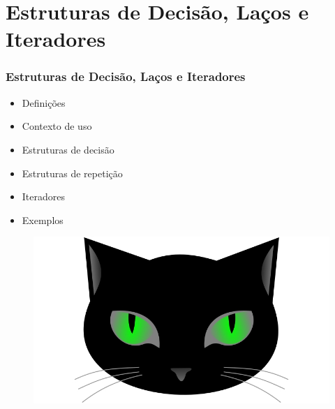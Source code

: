 \section{Estruturas de Decisão, Laços e Iteradores}

\begin{frame}
\frametitle{Estruturas de Decisão, Laços e Iteradores}
\begin{minipage}{0.47\textwidth}
    \begin{itemize}
        \item Definições
        \item Contexto de uso
        \item Estruturas de decisão
        \item Estruturas de repetição
        \item Iteradores
        \item Exemplos
    \end{itemize}
\end{minipage}
\begin{minipage}{0.5\textwidth}
\begin{figure}[ht!]
\begin{center}
\includegraphics[width=1.2\textwidth, height=0.40\textheight]{figures/logo_picat_alex.jpg}
\end{center}
\end{figure}
\end{minipage}
\end{frame}

